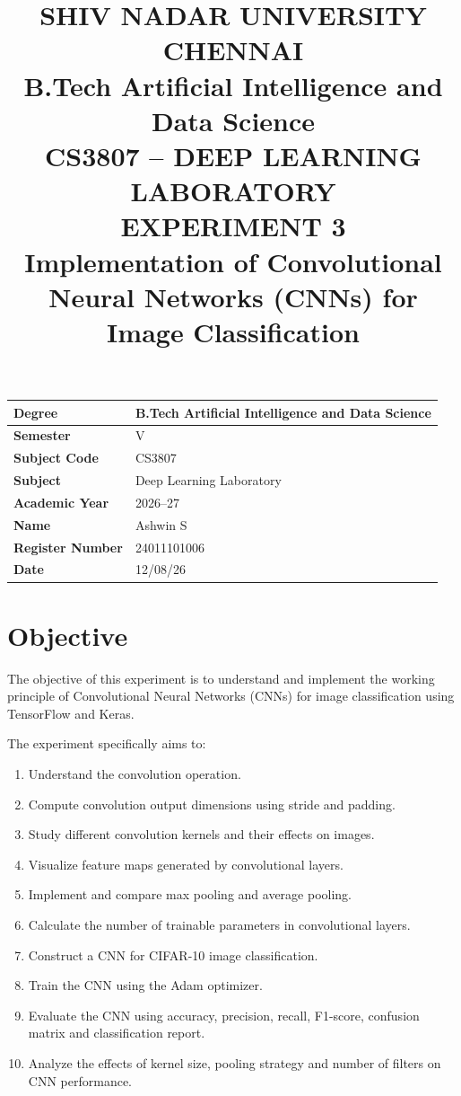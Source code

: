 \documentclass[11pt]{article}
\title{\textbf{SHIV NADAR UNIVERSITY CHENNAI} \\[2pt]
\large B.Tech Artificial Intelligence and Data Science \\[2pt]
CS3807 -- DEEP LEARNING LABORATORY \\[10pt]
\Large EXPERIMENT 3 \\[4pt]
\large Implementation of Convolutional Neural Networks (CNNs) for Image Classification}
\author{}
\date{}
\begin{document}
\maketitle
\thispagestyle{fancy}

\begin{center}
\begin{tabular}{|l|l|}
\hline
\textbf{Degree} & B.Tech Artificial Intelligence and Data Science \\
\hline
\textbf{Semester} & V \\
\hline
\textbf{Subject Code} & CS3807 \\
\hline
\textbf{Subject} & Deep Learning Laboratory \\
\hline
\textbf{Academic Year} & 2026--27 \\
\hline
\textbf{Name} & Ashwin S \\
\hline
\textbf{Register Number} & 24011101006 \\
\hline
\textbf{Date} & 12/08/26 \\
\hline
\end{tabular}
\end{center}



\tableofcontents
\newpage

\section{Objective}
The objective of this experiment is to understand and implement the working principle of Convolutional Neural Networks (CNNs) for image classification using TensorFlow and Keras.

The experiment specifically aims to:
\begin{enumerate}
    \item Understand the convolution operation.
    \item Compute convolution output dimensions using stride and padding.
    \item Study different convolution kernels and their effects on images.
    \item Visualize feature maps generated by convolutional layers.
    \item Implement and compare max pooling and average pooling.
    \item Calculate the number of trainable parameters in convolutional layers.
    \item Construct a CNN for CIFAR-10 image classification.
    \item Train the CNN using the Adam optimizer.
    \item Evaluate the CNN using accuracy, precision, recall, F1-score, confusion matrix and classification report.
    \item Analyze the effects of kernel size, pooling strategy and number of filters on CNN performance.
\end{enumerate}
\end{document}
